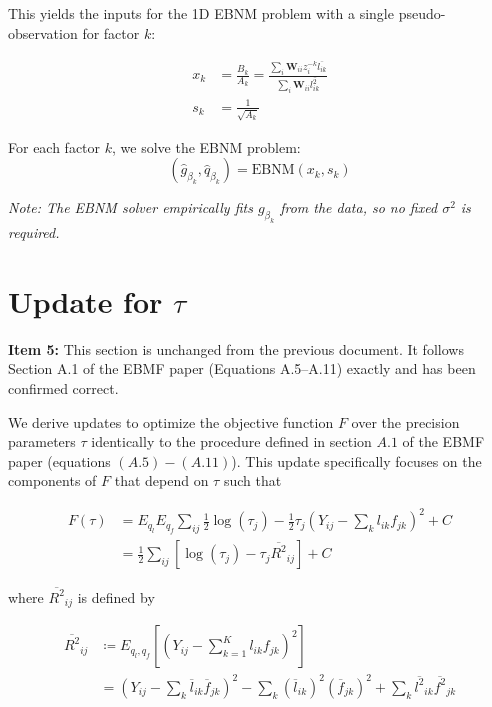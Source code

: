 \documentclass{article}[12pt]
\begin{document}
This yields the inputs for the 1D EBNM problem with a single pseudo-observation for factor $k$:

\begin{align}
    x_k &= \frac{B_k}{A_k} = \frac{\sum_i \mathbf{W}_{ii} z_i^{-k} \overline{l_{ik}}}{\sum_i \mathbf{W}_{ii} \overline{l_{ik}^2}}\label{eq:xk-beta} \\
    s_k &= \frac{1}{\sqrt{A_k}}\label{eq:sk-beta}
\end{align}

For each factor $k$, we solve the EBNM problem:
\begin{equation}
    (\hat{g}_{\beta_k}, \hat{q}_{\beta_k}) = \text{EBNM}(x_k, s_k)
\end{equation}

\textit{Note: The EBNM solver empirically fits $g_{\beta_k}$ from the data, so no fixed $\sigma^2$ is required.}

\section{Update for $\tau$}

\begin{corrbox}
\textbf{Item 5:} This section is unchanged from the previous document. It follows
Section A.1 of the EBMF paper (Equations A.5--A.11) exactly and has been
confirmed correct.
\end{corrbox}

\medskip
We derive updates to optimize the objective function $F$ over the precision parameters $\tau$ identically to the procedure defined in section $A.1$ of the EBMF paper (equations $(A.5)-(A.11)$). This update specifically focuses on the components of $F$ that depend on $\tau$ such that

\begin{align}
    F\left(\tau\right) &= E_{q_{l}}E_{q_{f}}\sum_{ij}\frac{1}{2}\log\left(\tau_{j}\right) - \frac{1}{2}\tau_{j}\left(Y_{ij}-\sum_{k}l_{ik}f_{jk}\right)^2 + C\\
    &= \frac{1}{2}\sum_{ij}\left[\log\left(\tau_{j}\right) - \tau_{j}\overline{R^2}_{ij}\right] + C
\end{align}

where $\overline{R^2}_{ij}$ is defined by

\begin{align}
    \overline{R^2}_{ij} &\coloneq E_{q_l, q_f}\left[\left(Y_{ij} - \sum_{k=1}^{K}l_{ik}f_{jk}\right)^2\right]\\
    &= \left(Y_{ij} - \sum_{k}\overline{l}_{ik}\overline{f}_{jk}\right)^2 - \sum_{k}\left(\overline{l}_{ik}\right)^2\left(\overline{f}_{jk}\right)^2 + \sum_{k}\overline{l^{2}}_{ik}\overline{f^{2}}_{jk}
\end{align}
\end{document}
